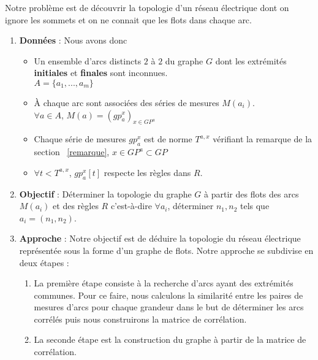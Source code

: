 Notre probl\`eme est de d\'ecouvrir la topologie d'un r\'eseau \'electrique dont on ignore les sommets et on ne connait que les flots dans chaque arc.
\begin{enumerate}
\item {\bf Donn\'ees} : 
\newline
Nous  avons donc
\begin{itemize}
	\item Un ensemble d'arcs distincts $2$ \`a $2$ du graphe $G$ dont les extr\'emit\'es \textbf{initiales} et \textbf{finales} sont inconnues.\\ $ A =\{ a_{1}, ... , a_{m} \} $ 
		
	\item \`A chaque arc sont associ\'ees des s\'eries de mesures $M(a_{i})$. \\
		$\forall a \in A$, $M(a) = ( gp_{a}^{x})_{x\in GP^{a}}$
		
	\item Chaque s\'erie de mesures $ gp_{a}^{x}$ est de norme $T^{a, x}$ v\'erifiant la remarque de la section ~\ref{remarque},  $x \in GP^{a} \subset GP$
	
	\item $\forall t < T^{a, x}$, $  gp_{a}^{x}[t] $ respecte les r\`egles dans $R$.
\end{itemize}
\item {\bf Objectif} : 
\newline
D\'eterminer la topologie  du graphe $G$ \`a partir des flots des arcs $M(a_{i})$ et des r\`egles $R$ c'est-\`a-dire $\forall a_i$, d\'eterminer $n_1,n_2$ tels que $a_i = (n_1,n_2)$.

\item {\bf Approche} :
\newline
Notre objectif est de d\'eduire la topologie du r\'eseau \'electrique repr\'esent\'ee sous la forme d'un graphe de flots. Notre approche se subdivise en deux \'etapes :
\begin{enumerate}
	\item La premi\`ere \'etape consiste \`a la recherche d'arcs ayant des extr\'emit\'es communes. Pour ce faire, nous calculons la similarit\'e entre les paires de mesures d'arcs pour chaque grandeur dans le but  de d\'eterminer les arcs corr\'el\'es puis nous construirons la matrice de corr\'elation. 
	\item La seconde \'etape est la construction du graphe \`a partir de la matrice de corr\'elation. 
\end{enumerate}


\end{enumerate}